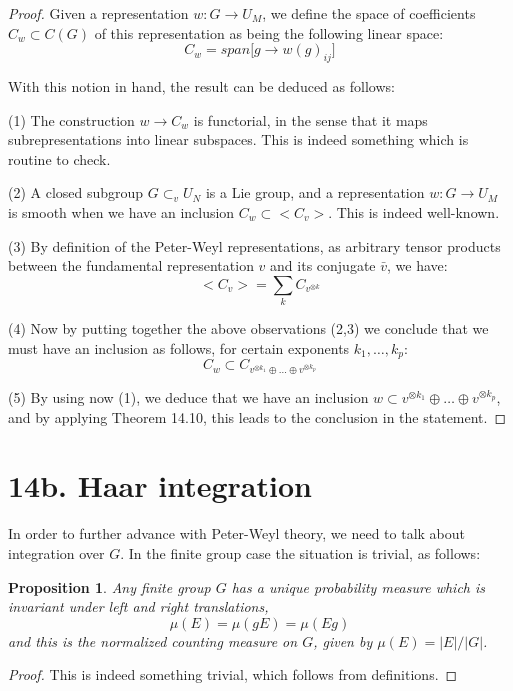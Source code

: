 \documentclass[12pt]{amsbook}
\newtheorem{proposition}[theorem]{Proposition}
\begin{document}
\begin{proof}
Given a representation $w:G\to U_M$, we define the space of coefficients $C_w\subset C(G)$ of this representation as being the following linear space:
$$C_w=span\Big[g\to w(g)_{ij}\Big]$$

With this notion in hand, the result can be deduced as follows:

\medskip

(1) The construction $w\to C_w$ is functorial, in the sense that it maps subrepresentations into linear subspaces. This is indeed something which is routine to check.

\medskip

(2) A closed subgroup $G\subset_vU_N$ is a Lie group, and a representation $w:G\to U_M$ is smooth when we have an inclusion $C_w\subset<C_v>$. This is indeed well-known.

\medskip

(3) By definition of the Peter-Weyl representations, as arbitrary tensor products between the fundamental representation $v$ and its conjugate $\bar{v}$, we have:
$$<C_v>=\sum_kC_{v^{\otimes k}}$$

(4) Now by putting together the above observations (2,3) we conclude that we must have an inclusion as follows, for certain exponents $k_1,\ldots,k_p$:
$$C_w\subset C_{v^{\otimes k_1}\oplus\ldots\oplus v^{\otimes k_p}}$$

(5) By using now (1), we deduce that we have an inclusion $w\subset v^{\otimes k_1}\oplus\ldots\oplus v^{\otimes k_p}$, and by applying Theorem 14.10, this leads to the conclusion in the statement.
\end{proof}

\section*{14b. Haar integration}

In order to further advance with Peter-Weyl theory, we need to talk about integration over $G$. In the finite group case the situation is trivial, as follows:

\begin{proposition}
Any finite group $G$ has a unique probability measure which is invariant under left and right translations,
$$\mu(E)=\mu(gE)=\mu(Eg)$$
and this is the normalized counting measure on $G$, given by $\mu(E)=|E|/|G|$.
\end{proposition}

\begin{proof}
This is indeed something trivial, which follows from definitions.
\end{proof}
\end{document}
